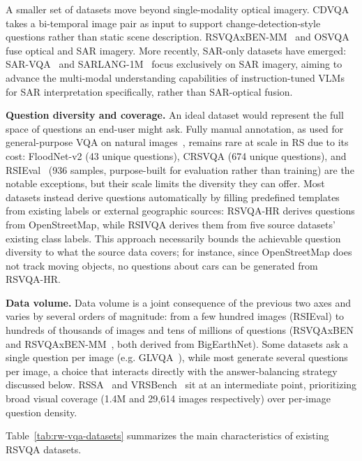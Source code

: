 A smaller set of datasets move beyond single-modality optical imagery. CDVQA~\cite{yuan2022cdvqa} takes a bi-temporal image pair as input to support change-detection-style questions rather than static scene description. RSVQAxBEN-MM~\cite{tosato2024can} and OSVQA~\cite{zhao2024textguided} fuse optical and SAR imagery. More recently, SAR-only datasets have emerged: SAR-VQA~\cite{cheng2025sartext} and SARLANG-1M~\cite{wei2025sarlang} focus exclusively on SAR imagery, aiming to advance the multi-modal understanding capabilities of instruction-tuned VLMs for SAR interpretation specifically, rather than SAR-optical fusion.

\textbf{Question diversity and coverage.} An ideal dataset would represent the full space of questions an end-user might ask. Fully manual annotation, as used for general-purpose VQA on natural images~\cite{lobry2020rsvqa}, remains rare at scale in RS due to its cost: FloodNet-v2 (43 unique questions), CRSVQA (674 unique questions), and RSIEval~\cite{hu2023rsgpt} (936 samples, purpose-built for evaluation rather than training) are the notable exceptions, but their scale limits the diversity they can offer. Most datasets instead derive questions automatically by filling predefined templates from existing labels or external geographic sources: RSVQA-HR derives questions from OpenStreetMap, while RSIVQA derives them from five source datasets' existing class labels. This approach necessarily bounds the achievable question diversity to what the source data covers; for instance, since OpenStreetMap does not track moving objects, no questions about cars can be generated from RSVQA-HR. 

\textbf{Data volume.} Data volume is a joint consequence of the previous two axes and varies by several orders of magnitude: from a few hundred images (RSIEval) to hundreds of thousands of images and tens of millions of questions (RSVQAxBEN and RSVQAxBEN-MM~\cite{lobry2021rsvqaben,tosato2024can}, both derived from BigEarthNet). Some datasets ask a single question per image (e.g. GLVQA~\cite{guo2022glvqa}), while most generate several questions per image, a choice that interacts directly with the answer-balancing strategy discussed below. RSSA~\cite{pang2024h2rsvlm} and VRSBench~\cite{li2024vrsbench} sit at an intermediate point, prioritizing broad visual coverage (1.4M and 29,614 images respectively) over per-image question density.

Table~\ref{tab:rw-vqa-datasets} summarizes the main characteristics of existing RSVQA datasets.

